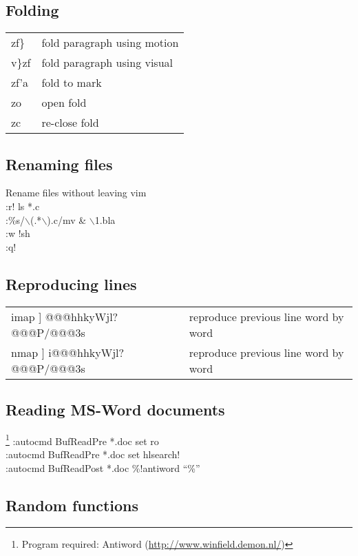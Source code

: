 \subsection{Folding}
\begin{center}
\begin{longtable}{l|l}
 zf\} & fold paragraph using motion\\
 v\}zf & fold paragraph using visual\\
 zf'a & fold to mark\\
 zo & open fold\\
 zc & re-close fold
\end{longtable}
\end{center}

\subsection{Renaming files}
 Rename files without leaving vim\\
 :r! ls *.c\\
 :\%s/$\backslash$(.*$\backslash$).c/mv \& $\backslash$1.bla\\
 :w !sh\\
 :q!

\subsection{Reproducing lines}
\begin{center}
\begin{longtable}{l|l}
 imap ] @@@hhkyWjl?@@@P/@@@3s & reproduce previous line word by word\\
 nmap ] i@@@hhkyWjl?@@@P/@@@3s & reproduce previous line word by word
\end{longtable}
\end{center}

\subsection{Reading MS-Word documents}
\footnote{Program required: Antiword (\url{http://www.winfield.demon.nl/})}
 :autocmd BufReadPre *.doc set ro\\
 :autocmd BufReadPre *.doc set hlsearch!\\
 :autocmd BufReadPost *.doc \%!antiword ``\%''

\subsection{Random functions}

